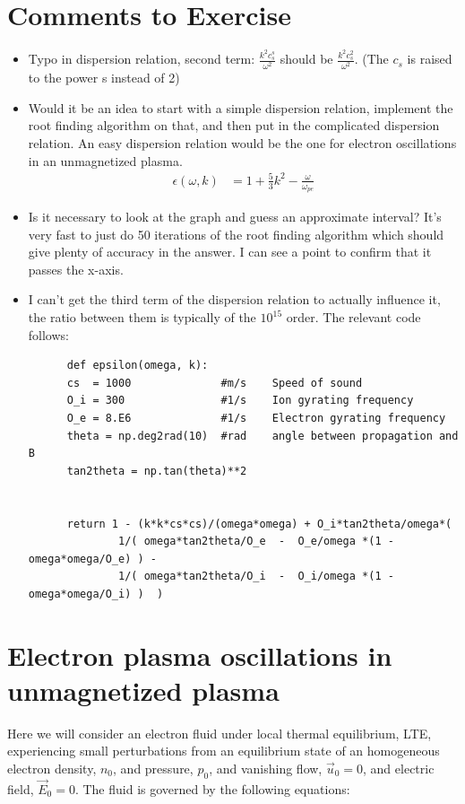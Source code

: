 \documentclass[x11names]{article}
\renewcommand{\va}{\vec}
\begin{document}
\newpage
\appendix
\section{Comments to Exercise}
  
  \begin{itemize}
    \item Typo in dispersion relation, second term: \(\frac{k^2c_s^s}{\omega^2}\) should be \(\frac{k^2c_s^2}{\omega^2}\). (The \(c_s\) is raised to the power s instead of 2)
    \item Would it be an idea to start with a simple dispersion relation, implement the root finding algorithm on that, and then put in the complicated dispersion relation. An easy dispersion relation would be the one for electron oscillations in an unmagnetized plasma.
    \begin{align}
      \epsilon(\omega, k) &= 1 + \frac{5}{3}k^2 - \frac{\omega}{\omega_{pe}}
    \end{align}
    \item Is it necessary to look at the graph and guess an approximate interval? It's very fast to just do 50 iterations of the root finding algorithm which should give plenty of accuracy in the answer. I can see a point to confirm that it passes the x-axis.
    \item I can't get the third term of the dispersion relation to actually influence it, the ratio between them is typically of the \(10^15\) order. The relevant code follows:
      \begin{lstlisting}
      def epsilon(omega, k):
      cs  = 1000              #m/s    Speed of sound
      O_i = 300               #1/s    Ion gyrating frequency
      O_e = 8.E6              #1/s    Electron gyrating frequency
      theta = np.deg2rad(10)  #rad    angle between propagation and B
      tan2theta = np.tan(theta)**2


      return 1 - (k*k*cs*cs)/(omega*omega) + O_i*tan2theta/omega*(
              1/( omega*tan2theta/O_e  -  O_e/omega *(1 - omega*omega/O_e) ) -
              1/( omega*tan2theta/O_i  -  O_i/omega *(1 - omega*omega/O_i) )  )
      \end{lstlisting}
  \end{itemize}


\section{Electron plasma oscillations in unmagnetized plasma}
  \label{sec:elec_plasma}
    Here we will consider an electron fluid under local thermal equilibrium, LTE, experiencing small perturbations from an equilibrium state of an homogeneous electron density, \(n_0\), and pressure, \(p_0\), and vanishing flow, \(\va{u}_0 = 0\), and electric field, \(\va{E}_0 = 0 \).
    The fluid is governed by the following equations:
\end{document}
